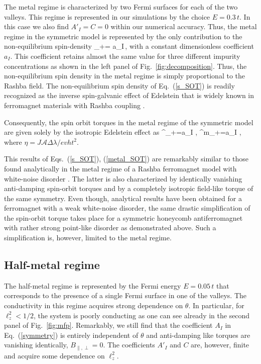 The metal regime is characterized by two Fermi surfaces for each of the two valleys. This regime is represented in our simulations by the choice $E=0.3\,t$. In this case we also find $A'_I=C=0$ within our numerical accuracy. Thus, the metal regime in the symmetric model is represented by the only contribution to the non-equilibrium spin-density
\be
\label{s_SOT}
\delta{}_+=  a_I\,\times {}, 
\e
with a constant dimensionless coefficient $a_I$. This coefficient retains almost the same value for three different impurity concentrations as 
shown in the left panel of Fig.~\ref{fig:decomposition}. Thus, the non-equilibrium spin density in the metal regime is simply proportional to the Rashba field. The non-equilibrium spin density of Eq.~(\ref{s_SOT}) is readily recognized as the inverse spin-galvanic effect of Edelstein \cite{Edelstein1990} that is widely known in ferromagnet materials with Rashba coupling \cite{ManchonPRB2008, GarateSOT2009}. 

Consequently, the spin orbit torques in the metal regime of the symmetric model are given solely by the isotropic Edelstein effect as
\be
\label{metal_SOT}
^\ell_+=a_I \eta\;\bb{\ell} \times{},\quad
{}^m_+=a_I \eta\; \!\times\!, 
\e
where $\eta=J\mathcal{A}\Delta\lambda /evh t^2$. 

This results of Eqs.~(\ref{s_SOT}), (\ref{metal_SOT}) are remarkably similar to those found analytically in the metal regime of a Rashba ferromagnet model with white-noise disorder \cite{AdoSOT2017,AdoSTTGD2019}. The latter is also characterized by identically vanishing anti-damping spin-orbit torques and by a completely isotropic field-like torque of the same symmetry. Even though, analytical results have been obtained for a ferromagnet with a weak white-noise disorder, the same drastic simplification of the spin-orbit torque takes place for a symmetric honeycomb antiferromagnet with rather strong point-like disorder as demonstrated above. Such a simplification is, however, limited to the metal regime. 
 
\subsection{Half-metal regime} 
 
The half-metal regime is represented by the Fermi energy $E=0.05\,t$ that corresponds to the presence of a single Fermi surface in one of the valleys. The conductivity in this regime acquires strong dependence on $\theta$. In particular, for $\ell_z^2<1/2$, the system is poorly conducting as one can see already in the second panel of Fig.~\ref{fig:mfp}. Remarkably, we still find that the coefficient $A_I$ in Eq.~(\ref{symmetry}) is entirely independent of $\theta$ and anti-damping like torques are vanishing identically, $B_{\parallel,\perp}=0$. The coefficients $A'_I$ and $C$ are, however, finite and acquire some dependence on $\ell_z^2$.   


